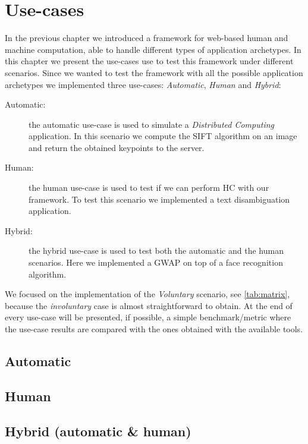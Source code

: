 \chapter{Use-cases}
\label{cap:cases}

In the previous chapter we introduced a framework for web-based human and machine
computation, able to handle different types of application archetypes. In this
chapter we present the use-cases use to test this framework under different
scenarios. Since we wanted to test the framework with all the possible application
archetypes we implemented three use-cases: \emph{Automatic}, \emph{Human} and
\emph{Hybrid}:
\begin{description}
    \item[Automatic:] the automatic use-case is used to simulate a
    \emph{Distributed Computing} application. In this scenario we compute the
    SIFT algorithm on an image and return the obtained keypoints to the server.
    \item[Human:] the human use-case is used to test if we can perform \acl{HC}
    with our framework. To test this scenario we implemented a text disambiguation
    application.
    \item[Hybrid:] the hybrid use-case is used to test both the automatic and the
    human scenarios. Here we implemented a \ac{GWAP} on top of a face recognition
    algorithm.
\end{description}
\noindent We focused on the implementation of the \emph{Voluntary} scenario, see
\autoref{tab:matrix}, because the \emph{involuntary} case is almost straightforward
to obtain.
At the end of every use-case will be presented, if possible, a simple
benchmark/metric where the use-case results are compared with the ones obtained
with the available tools. 



\section{Automatic}
\label{sec:cases:automatic}


\section{Human}
\label{sec:cases:human}



\section{Hybrid (automatic \& human)}
\label{sec:cases:hybrid}
